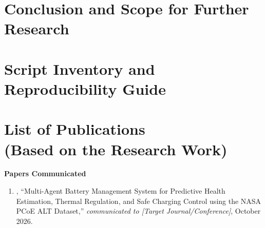 \documentclass[a4paper, 12pt]{report}
\theoremstyle{definition}
\begin{document}
\chapter{Conclusion and Scope for Further Research}


\appendix
\chapter{Script Inventory and Reproducibility Guide}


\newpage
\renewcommand{\bibname}{References}



\chapter*{List of Publications\\{\large (Based on the Research Work)}}
\textbf{\Large Papers Communicated}
\begin{enumerate}
  \item [Student Names], ``Multi-Agent Battery Management System for
  Predictive Health Estimation, Thermal Regulation, and Safe Charging
  Control using the NASA PCoE ALT Dataset,'' \emph{communicated to
  [Target Journal/Conference]}, October 2026.
\end{enumerate}
\end{document}
